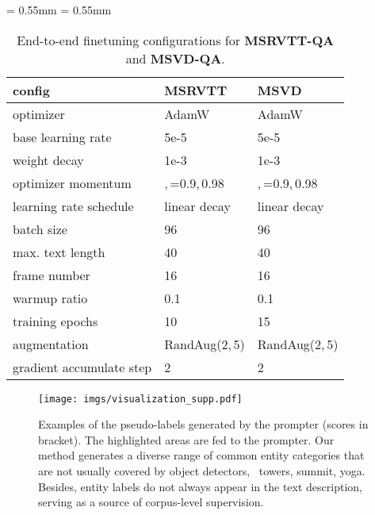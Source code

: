 \documentclass[10pt,twocolumn,letterpaper]{article}
\begin{document}
\begin{table}[h]
\centering
\footnotesize
{
    \aboverulesep = 0.55mm
    \belowrulesep = 0.55mm
\centering	
\begin{tabular}	{l| l | l}
			\toprule
			\textbf{config} & \textbf{MSRVTT} & \textbf{MSVD}\\
\midrule
	optimizer & AdamW & AdamW \\
	base learning rate & 5e-5 & 5e-5\\
	weight decay & 1e-3 & 1e-3\\	optimizer momentum & ,\,=0.9,\,0.98& ,\,=0.9,\,0.98 \\
	learning rate schedule & linear decay & linear decay\\
	batch size & 96 & 96\\
	max. text length & 40 & 40 \\
	frame number & 16& 16 \\
	warmup ratio & 0.1 & 0.1\\
	training epochs & 10 & 15\\
	augmentation & RandAug(2,\,5)& RandAug(2,\,5) \\
	gradient accumulate step & 2 & 2\\
			\bottomrule
		\end{tabular}}
\vspace{-5pt}
    \caption
	{End-to-end finetuning configurations for \textbf{MSRVTT-QA} and \textbf{MSVD-QA}.
	}
	\label{tbl:msrvtt-qa}
\vspace{-10pt}
\end{table}

%
 
\begin{figure*}[ht]
\centering
  \texttt{[image: imgs/visualization\_supp.pdf]}
\caption{Examples of the pseudo-labels generated by the prompter (scores in bracket). The highlighted areas are fed to the prompter. Our method generates a diverse range of common entity categories that are not usually covered by object detectors, \eg~towers, summit, yoga.
Besides, entity labels do not always appear in the text description, serving as a source of corpus-level supervision.}
\label{fig:supp-plabel}


\end{figure*}
  
\end{document}
